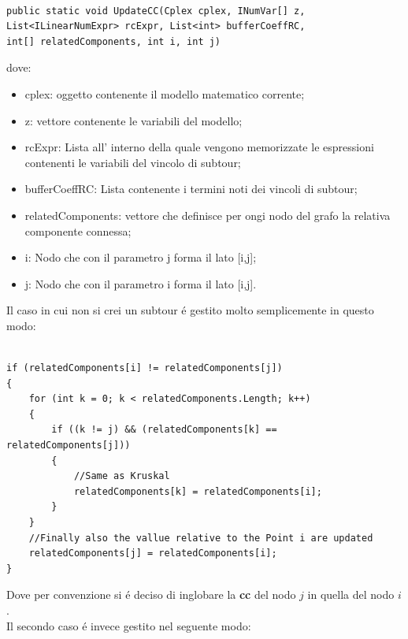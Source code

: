 \documentclass[11pt]{article}
\begin{document}
\begin{lstlisting}

public static void UpdateCC(Cplex cplex, INumVar[] z, List<ILinearNumExpr> rcExpr, List<int> bufferCoeffRC,                int[] relatedComponents, int i, int j)

\end{lstlisting}

dove:
\begin{itemize}
\item cplex: oggetto contenente il modello matematico corrente;
\item z: vettore contenente le variabili del modello;
\item rcExpr: Lista all' interno della quale vengono memorizzate le espressioni contenenti le variabili del vincolo di subtour;
\item bufferCoeffRC: Lista contenente i termini noti dei vincoli di subtour;
\item relatedComponents: vettore che definisce per ongi nodo del grafo la relativa componente connessa;
\item i: Nodo che con il parametro j forma il lato [i,j];
\item j: Nodo che con il parametro i forma il lato [i,j].
\end{itemize}

Il caso in cui non si crei un subtour \'e gestito molto semplicemente in questo modo:

\begin{lstlisting}

if (relatedComponents[i] != relatedComponents[j])
{
	for (int k = 0; k < relatedComponents.Length; k++)
	{
		if ((k != j) && (relatedComponents[k] == relatedComponents[j]))
		{
			//Same as Kruskal
			relatedComponents[k] = relatedComponents[i];
		}
	}
	//Finally also the vallue relative to the Point i are updated
	relatedComponents[j] = relatedComponents[i];
}

\end{lstlisting}

Dove per convenzione si \'e deciso di inglobare la \textbf{cc} del nodo $j$ in quella del nodo $i$.\\
Il secondo caso \'e invece gestito nel seguente modo:
\end{document}
